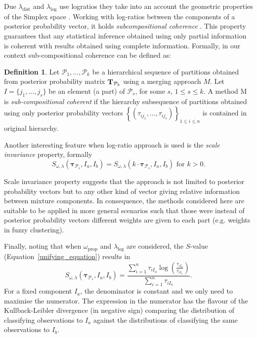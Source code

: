 \documentclass[submit]{smj}
\theoremstyle{definition}
\newtheorem{defn}{Definition}[section]
\newcommand{\m}[1]{\boldsymbol{#1}}
\begin{document}
Due $\lambda_{\text{dist}}$ and $\lambda_{\log}$ use logratios they take into an account the geometric properties of the Simplex space \citep{aitchison2002simplicial}.  Working with log-ratios between the components of a posterior probability vector, it holds \emph{subcompositional coherence}  \citep{aitchison1986statistical}. This property guarantees that any statistical inference obtained using only partial information is coherent with results obtained using complete information. Formally, in our context sub-compositional coherence can be defined as:

\begin{defn}
Let $\mathcal{P}_1, \dots, \mathcal{P}_k$ be a hierarchical sequence of partitions obtained from posterior probability matrix $\text{\textbf{T}}_{\mathcal{P}_k}$ using a merging approach $M$. Let $I = \{j_1, \dots, j_s\}$ be an element (a part) of $\mathcal{P}_s$, for some $s$, $1\leq s \leq k$. A method M is \emph{sub-compositional coherent} if the hierarchy subsequence of partitions obtained  using only posterior probability vectors $\left\{ \left(\tau_{ij_1}, \dots, \tau_{ij_s} \right)\right\}_{1\leq i \leq n}$ is contained in original hierarchy.
\end{defn}

Another interesting feature when log-ratio approach is used is the \emph{scale invariance} property, formally
\[
S_{\omega, \lambda}( \m\tau_{\mathcal{P}_s},  I_a,  I_b) = S_{\omega, \lambda}(k\cdot \m\tau_{\mathcal{P}_s},  I_a,  I_b) \text{ for $k>0$.}
\] 

Scale invariance property suggests that the approach is not limited to posterior probability vectors but to any other kind of vector giving relative information between mixture components. In consequence, the methods considered here are suitable to be applied in more general scenarios such that those were instead of posterior probability vectors different weights are given to each part (e.g. weights in fuzzy clustering).

Finally, noting that when $\omega_{\text{prop}}$ and $\lambda_{\log}$ are considered, the $S$-value (Equation~\ref{unifying_equation}) results in
\[
S_{\omega, \lambda}( \m\tau_{\mathcal{P}_s},  I_a,  I_b) = \frac{\sum_{i=1}^n\tau_{iI_a}  \log \left(\frac{ \tau_{iI_b} }{ \tau_{iI_a} }\right)}{\sum_{i=1}^n \tau_{iI_a}}.
\]
For a fixed component $I_a$, the denominator is constant and we only need to maximise the numerator. The expression in the numerator has the flavour of the Kullback-Leibler divergence (in negative sign) comparing the distribution of classifying observations to $I_a$ against the distributions of classifying the same observations to $I_b$.
\end{document}
